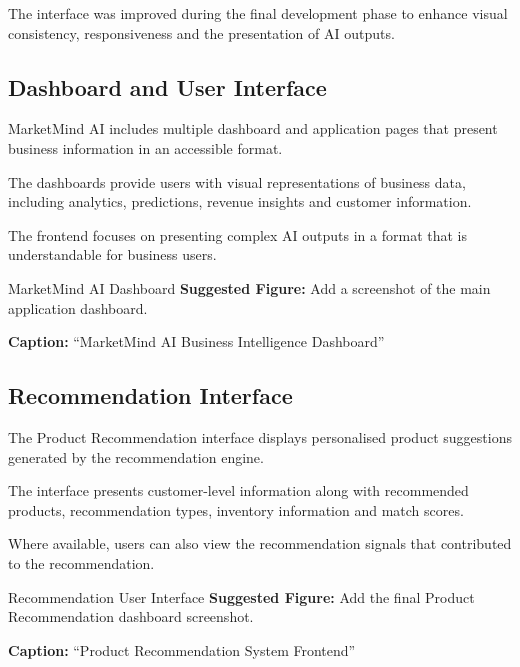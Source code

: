 \documentclass[12pt,a4paper]{report}
\begin{document}
The interface was improved during the final development phase to enhance
visual consistency, responsiveness and the presentation of AI outputs.


\subsection{Dashboard and User Interface}

MarketMind AI includes multiple dashboard and application pages that
present business information in an accessible format.

The dashboards provide users with visual representations of business
data, including analytics, predictions, revenue insights and customer
information.

The frontend focuses on presenting complex AI outputs in a format that
is understandable for business users.

\begin{screenshotplaceholder}{MarketMind AI Dashboard}
\textbf{Suggested Figure:} Add a screenshot of the main application
dashboard.

\textbf{Caption:} ``MarketMind AI Business Intelligence Dashboard''
\end{screenshotplaceholder}


\subsection{Recommendation Interface}

The Product Recommendation interface displays personalised product
suggestions generated by the recommendation engine.

The interface presents customer-level information along with recommended
products, recommendation types, inventory information and match scores.

Where available, users can also view the recommendation signals that
contributed to the recommendation.

\begin{screenshotplaceholder}{Recommendation User Interface}
\textbf{Suggested Figure:} Add the final Product Recommendation
dashboard screenshot.

\textbf{Caption:} ``Product Recommendation System Frontend''
\end{screenshotplaceholder}


\end{document}
